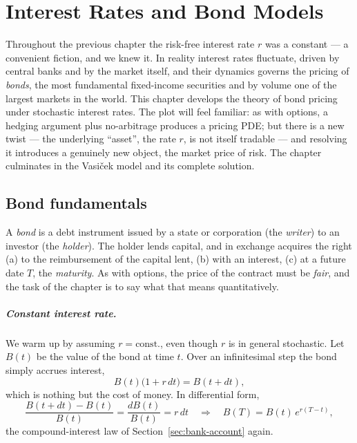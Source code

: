
\chapter{Interest Rates and Bond Models}

Throughout the previous chapter the risk-free interest rate $r$ was a constant --- a convenient fiction, and we knew it.
In reality interest rates fluctuate, driven by central banks and by the market itself, and their dynamics governs the pricing of \emph{bonds}, the most fundamental fixed-income securities and by volume one of the largest markets in the world.
This chapter develops the theory of bond pricing under stochastic interest rates.
The plot will feel familiar: as with options, a hedging argument plus no-arbitrage produces a pricing PDE; but there is a new twist --- the underlying ``asset'', the rate $r$, is not itself tradable --- and resolving it introduces a genuinely new object, the market price of risk.
The chapter culminates in the Vasi\v{c}ek model and its complete solution.


\section{Bond fundamentals}

A \emph{bond} is a debt instrument issued by a state or corporation (the \emph{writer}) to an investor (the \emph{holder}).
The holder lends capital, and in exchange acquires the right (a) to the reimbursement of the capital lent, (b) with an interest, (c) at a future date $T$, the \emph{maturity}.
As with options, the price of the contract must be \emph{fair}, and the task of the chapter is to say what that means quantitatively.

\paragraph*{Constant interest rate.}

We warm up by assuming $r = \text{const.}$, even though $r$ is in general stochastic.
Let $B(t)$ be the value of the bond at time $t$.
Over an infinitesimal step the bond simply accrues interest,
\begin{equation}
B(t)\bigl(1 + r\,dt\bigr) = B(t+dt),
\end{equation}
which is nothing but the cost of money.
In differential form,
\begin{equation}
\frac{B(t+dt) - B(t)}{B(t)} = \frac{dB(t)}{B(t)} = r\,dt
\quad\Longrightarrow\quad
B(T) = B(t)\, e^{r(T-t)},
\end{equation}
the compound-interest law of Section~\ref{sec:bank-account} again.

